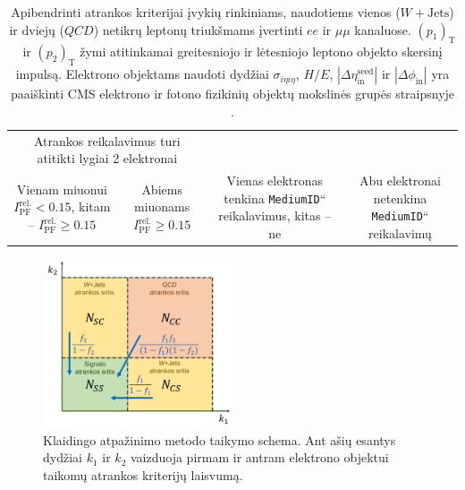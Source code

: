 \documentclass[a4paper, 12pt, oneside]{article}
\newcommand{\ttt}[1]{\texttt{#1}}
\newcommand{\WJets}{W\! +\!\mathrm{Jets}}
\newcommand{\ltq}[1]{{\quotedblbase{}#1\textquotedblleft{}}}
\newcommand{\QCD}{QC\! D}
\newlength\q
\begin{document}
\begin{table}[!b]
\begin{tabular}{|c|c|c|c|}
			\multicolumn{2}{c|}{\multirow{2}{19em}{\centering Atrankos reikalavimus turi atitikti lygiai 2 elektronai}} \\
		\multicolumn{2}{|c|}{ } & \multicolumn{2}{c|}{ } \\
		\hline
		\multirow{3}{9em}{\centering Vienam miuonui $I_{\mathrm{PF}}^{\mathrm{rel.}}<0.15$,
			kitam -- $I_{\mathrm{PF}}^{\mathrm{rel.}}\geqslant 0.15$} &
			\multirow{3}{7em}{\centering Abiems miuonams $I_{\mathrm{PF}}^{\mathrm{rel.}}\geqslant 0.15$} &
			\multirow{3}{10em}{\centering Vienas elektronas tenkina \ltq{\ttt{MediumID}} reikalavimus, kitas -- ne} &
			\multirow{3}{10em}{\centering Abu elektronai netenkina \ltq{\ttt{MediumID}} reikalavimų} \\
		 & & & \\
		 & & & \\
		\hline
	\end{tabular}
	\caption{\label{table:jetSelection} Apibendrinti atrankos kriterijai įvykių rinkiniams, naudotiems vienos ($\WJets$) ir
	dviejų ($\QCD$) netikrų leptonų triukšmams įvertinti $ee$ ir $\mu\mu$ kanaluose.
	$(p_1)_\mathrm{T}$ ir $(p_2)_\mathrm{T}$ žymi atitinkamai greitesniojo ir lėtesniojo leptono objekto skersinį impulsą.
	Elektrono objektams naudoti dydžiai $\sigma_{i\eta i\eta}$, $H/E$, $|\Delta\eta_{\mathrm{in}}^{\mathrm{seed}}|$ ir
	$|\Delta\phi_{\mathrm{in}}|$ yra paaiškinti CMS elektrono ir fotono fizikinių objektų mokslinės grupės straipsnyje \cite{EleID}.}
\end{table}


\begin{figure}[t!]
	\includegraphics[width=0.5\textwidth]{Magistrinis/FRschema.png}
	\vspace{-0.3cm}
	\caption{\label{fig:FRscheme}Klaidingo atpažinimo metodo taikymo schema.
	Ant ašių esantys dydžiai $k_1$ ir $k_2$ vaizduoja pirmam ir antram elektrono objektui taikomų atrankos
	kriterijų laisvumą.}
\end{figure}
\end{document}
